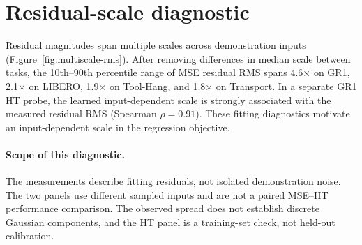 \documentclass{article}
\begin{document}
\section*{Residual-scale diagnostic}

Residual magnitudes span multiple scales across demonstration inputs
(Figure~\ref{fig:multiscale-rms}). After removing differences in median
scale between tasks, the 10th--90th percentile range of MSE residual RMS
spans 4.6$\times$ on GR1, 2.1$\times$ on LIBERO, 1.9$\times$ on Tool-Hang,
and 1.8$\times$ on Transport. In a separate GR1 HT probe, the learned
input-dependent scale is strongly associated with the measured residual
RMS (Spearman $\rho=0.91$). These fitting diagnostics motivate an
input-dependent scale in the regression objective.
\paragraph{Scope of this diagnostic.}
The measurements describe fitting residuals, not isolated demonstration
noise. The two panels use different sampled inputs and are not a paired
MSE--HT performance comparison. The observed spread does not establish
discrete Gaussian components, and the HT panel is a training-set check,
not held-out calibration.
\end{document}
